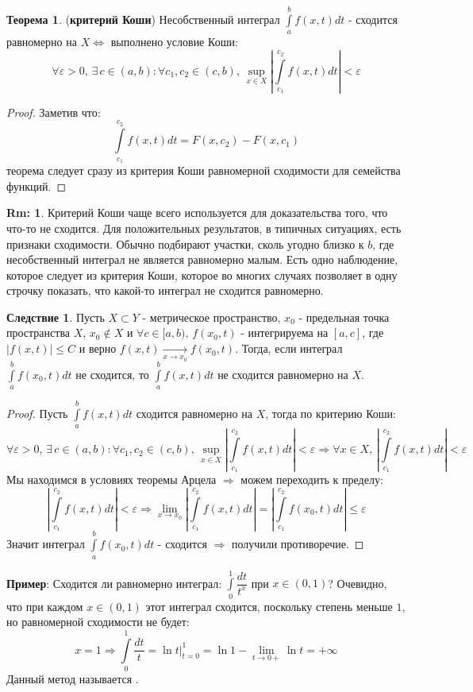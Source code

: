 \documentclass[12pt]{article}
\newcommand{\VE}{\varepsilon}
\theoremstyle{definition}
\newtheorem{rem}{Rm:}
\newtheorem{theorem}{Теорема}
\newtheorem{corollary}{Следствие}
\newcommand{\ddint}[2]{\displaystyle\int\limits_{#1}^{#2}}
\begin{document}
\begin{theorem}(\textbf{критерий Коши})
	Несобственный интеграл $\ddint{a}{b}f(x,t)dt$ - сходится равномерно на $X \Leftrightarrow$
	выполнено условие Коши:
	$$
		\forall \VE > 0, \, \exists \, c \in (a,b) \colon \forall c_1, c_2 \in (c,b), \, \sup\limits_{x \in X} \left|\ddint{c_1}{c_2}f(x,t)dt\right| < \VE
	$$
\end{theorem}
\begin{proof}
	Заметив что:
	$$
		\ddint{c_1}{c_2}f(x,t)dt = F(x,c_2) - F(x, c_1)
	$$
	теорема следует сразу из критерия Коши равномерной сходимости для семейства функций.
\end{proof}
\begin{rem}
	Критерий Коши чаще всего используется для доказательства того, что что-то не сходится. Для положительных результатов, в типичных ситуациях, есть признаки сходимости. Обычно подбирают участки, сколь угодно близко к $b$, где несобственный интеграл не является равномерно малым. Есть одно наблюдение, которое следует из критерия Коши, которое во многих случаях позволяет в одну строчку показать, что какой-то интеграл не сходится равномерно.
\end{rem}
\begin{corollary}
	Пусть $X \subset Y$ - метрическое пространство, $x_0$ - предельная точка пространства $X$, $x_0\notin X$ и $\forall c \in [a,b),\, f(x_0,t)$ - интегрируема на $[a,c]$, где $|f(x,t)| \leq C$ и верно $f(x,t) \xrightarrow[x \to x_0]{} f(x_0,t)$. Тогда, если интеграл $\ddint{a}{b}f(x_0,t)dt$ не сходится, то $\ddint{a}{b}f(x,t)dt$ не сходится равномерно на $X$.
\end{corollary}
\begin{proof}
	Пусть $\ddint{a}{b}f(x,t)dt$ сходится равномерно на $X$, тогда по критерию Коши:
	$$
		\forall \VE > 0, \, \exists \, c \in (a,b) \colon \forall c_1, c_2 \in (c,b), \, \sup\limits_{x \in X} \left|\ddint{c_1}{c_2}f(x,t)dt\right| < \VE \Rightarrow \forall x \in X, \, \left|\ddint{c_1}{c_2}f(x,t)dt\right| < \VE  
	$$
	Мы находимся в условиях теоремы Арцела $\Rightarrow$ можем переходить к пределу:
	$$
		\left|\ddint{c_1}{c_2}f(x,t)dt\right| < \VE  \Rightarrow \lim\limits_{x \to x_0}\left|\ddint{c_1}{c_2}f(x,t)dt\right| = \left|\ddint{c_1}{c_2}f(x_0,t)dt\right| \leq \VE  
	$$
	Значит интеграл $\ddint{a}{b}f(x_0,t)dt$ - сходится $\Rightarrow$ получили противоречие.
\end{proof}

\textbf{Пример}: Сходится ли равномерно интеграл: $\ddint{0}{1}\dfrac{dt}{t^x}$ при $x \in (0,1)$? Очевидно, что при каждом $x \in (0,1)$ этот интеграл сходится, поскольку степень меньше $1$, но равномерной сходимости не будет:
$$
	x = 1 \Rightarrow \ddint{0}{1}\dfrac{dt}{t} = \ln{t}\Big|_{t = 0}^{1} = \ln{1} - \lim\limits_{t \to 0+}\ln{t} = +\infty
$$
Данный метод называется .
\end{document}

